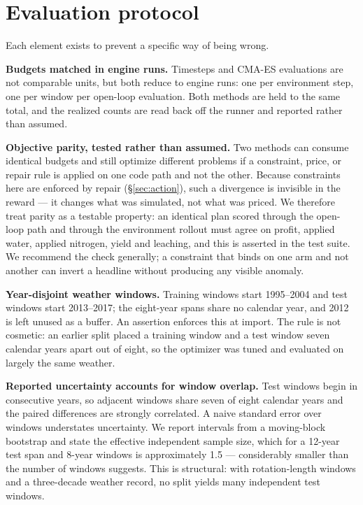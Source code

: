\documentclass[a4paper,fleqn]{cas-sc}
\begin{document}
\section{Evaluation protocol}\label{sec:protocol}

Each element exists to prevent a specific way of being wrong.

\textbf{Budgets matched in engine runs.} Timesteps and CMA-ES evaluations are not
comparable units, but both reduce to engine runs: one per environment step, one per
window per open-loop evaluation. Both methods are held to the same total, and the
realized counts are read back off the runner and reported rather than assumed.

\textbf{Objective parity, tested rather than assumed.} Two methods can consume identical
budgets and still optimize different problems if a constraint, price, or repair rule is
applied on one code path and not the other. Because constraints here are enforced by
repair (\S\ref{sec:action}), such a divergence is invisible in the reward --- it changes
what was simulated, not what was priced. We therefore treat parity as a testable
property: an identical plan scored through the open-loop path and through the
environment rollout must agree on profit, applied water, applied nitrogen, yield and
leaching, and this is asserted in the test suite. We recommend the check generally; a
constraint that binds on one arm and not another can invert a headline without producing
any visible anomaly.

\textbf{Year-disjoint weather windows.} Training windows start 1995--2004 and test
windows start 2013--2017; the eight-year spans share no calendar year, and 2012 is left
unused as a buffer. An assertion enforces this at import. The rule is not cosmetic: an
earlier split placed a training window and a test window seven calendar years apart out
of eight, so the optimizer was tuned and evaluated on largely the same weather.

\textbf{Reported uncertainty accounts for window overlap.} Test windows begin in
consecutive years, so adjacent windows share seven of eight calendar years and the
paired differences are strongly correlated. A naive standard error over windows
understates uncertainty. We report intervals from a moving-block bootstrap and state the
effective independent sample size, which for a 12-year test span and 8-year windows is
approximately 1.5 --- considerably smaller than the number of windows suggests. This is
structural: with rotation-length windows and a three-decade weather record, no split
yields many independent test windows.
\end{document}
